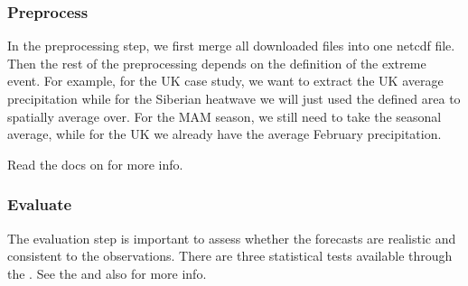 \documentclass[letterpaper,10pt,english]{sphinxmanual}
\begin{document}
{
\begin{sphinxVerbatim}[commandchars=\\\{\}]
\llap{\color{nbsphinxin}[3]:\,\hspace{\fboxrule}\hspace{\fboxsep}}\PYG{p}{[} \PYG{p}{]}
                       \PYG{p}{[}  \PYG{p}{]}
                       \PYG{p}{[}   \PYG{p}{]}
\end{sphinxVerbatim}
}


\subsubsection{Preprocess}
\label{\detokenize{Notebooks/Workflow:Preprocess}}
In the preprocessing step, we first merge all downloaded files into one netcdf file. Then the rest of the preprocessing depends on the definition of the extreme event. For example, for the UK case study, we want to extract the UK average precipitation while for the Siberian heatwave we will just used the defined area to spatially average over. For the MAM season, we still need to take the seasonal average, while for the UK we already have the average February precipitation.

Read the docs on {\hyperref[\detokenize{Notebooks/2.Preprocess/2.Preprocess::doc}]{}} for more info.


\subsubsection{Evaluate}
\label{\detokenize{Notebooks/Workflow:Evaluate}}
The evaluation step is important to assess whether the forecasts are realistic and consistent to the observations. There are three statistical tests available through the . See the {\hyperref[\detokenize{Notebooks/3.Evaluate/3.Evaluate::doc}]{}} and also  for more info.
\end{document}
